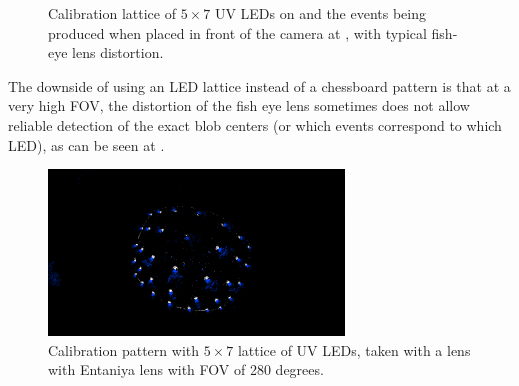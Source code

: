 \begin{figure}[H]
	\centering
	\caption{
		Calibration lattice of $5\times7$ UV LEDs on  and the events being produced when placed in front of the camera at ,
		with typical fish-eye lens distortion.
  }
	\label{fig:lattice}
\end{figure}
The downside of using an LED lattice instead of a chessboard pattern is that at a very high \ac{FOV}, the distortion of the fish eye lens sometimes does not allow
reliable detection of the exact blob centers (or which events correspond to which LED), as can be seen at .
\begin{figure}[H]
  \centering
  \includegraphics[width=0.7\textwidth]{./fig/photos/lattice_280.png}
  \caption{Calibration pattern with $5\times7$ lattice of UV LEDs, taken with a lens with Entaniya lens with \ac{FOV} of 280 degrees.}
  \label{fig:calibration_pattern_distorted}
\end{figure}

